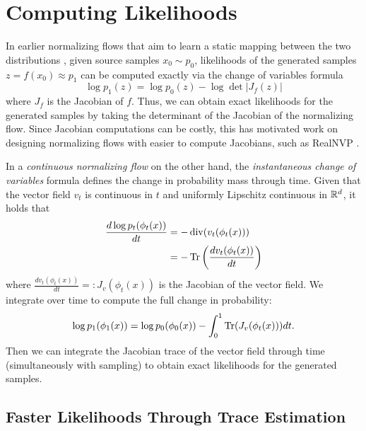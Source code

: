 \section{Computing Likelihoods} \label{section:computing_likelihoods}

In earlier normalizing flows that aim to learn a static mapping between the two distributions \citep{rezendeVariationalInferenceNormalizing2015}, given source samples $x_0 \sim p_0$, likelihoods of the generated samples $z = f(x_0) \approx p_1$  can be computed exactly via the change of variables formula
\begin{equation} \label{eq:static_cov}
    \log p_1(z) = \log p_0(z) - \log \det \left\vert J_f(z) \right\vert
\end{equation}
where $J_f$ is the Jacobian of $f$. Thus, we can obtain exact likelihoods for the generated samples by taking the determinant of the Jacobian of the normalizing flow. Since Jacobian computations can be costly, this has motivated work on designing normalizing flows with easier to compute Jacobians, such as RealNVP \citep{dinhDensityEstimationUsing2017}. 

In a \textit{continuous normalizing flow} on the other hand, the \textit{instantaneous change of variables} formula \citep{chenNeuralOrdinaryDifferential2018a} defines the change in probability mass through time. Given that the vector field $v_t$ is continuous in $t$ and uniformly Lipschitz continuous in $\mathbb{R}^d$, it holds that
\begin{align} \label{eq:continuous_cov}
    \frac{d \log p_t(\phi_t(x))}{dt} &= - \operatorname{div}(v_t(\phi_t(x))) \\
                                     &= - \operatorname{Tr} \left( \frac{d v_t(\phi_t(x))}{dt} \right)
\end{align}
where $\frac{d v_t(\phi_t(x))}{dt} =: J_v(\phi_t(x))$ is the Jacobian of the vector field. We integrate over time to compute the full change in probability:
\begin{equation} \label{eq:full_continuous_cov}
    \log p_1(\phi_1(x)) = \log p_0(\phi_0(x)) - \int_0^1 \operatorname{Tr}(J_v(\phi_t(x))) dt.
\end{equation}
Then we can integrate the Jacobian trace of the vector field through time (simultaneously with sampling) to obtain exact likelihoods for the generated samples. 

\subsection{Faster Likelihoods Through Trace Estimation} \label{section:trace_estimation}


